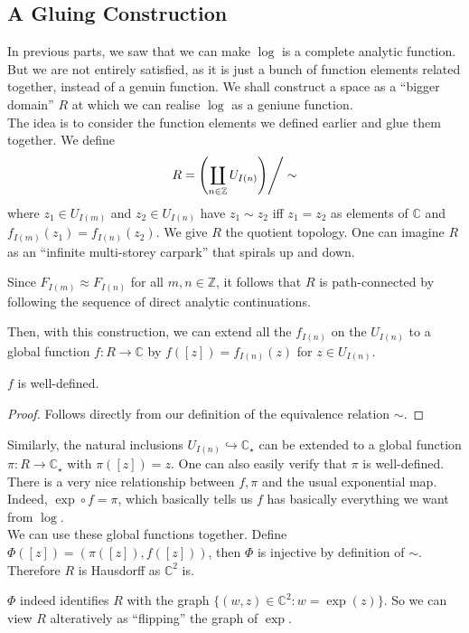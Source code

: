 \subsection{A Gluing Construction}
In previous parts, we saw that we can make $\log$ is a complete analytic function.
But we are not entirely satisfied, as it is just a bunch of function elements related together, instead of a genuin function.
We shall construct a space as a ``bigger domain'' $R$ at which we can realise $\log$ as a geniune function.\\
The idea is to consider the function elements we defined earlier and glue them together.
We define
$$R=\left( \coprod_{n\in\mathbb Z}U_{I(n)} \middle)\right/\sim$$
where $z_1\in U_{I(m)}$ and $z_2\in U_{I(n)}$ have $z_1\sim z_2$ iff $z_1=z_2$ as elements of $\mathbb C$ and $f_{I(m)}(z_1)=f_{I(n)}(z_2)$.
We give $R$ the quotient topology.
One can imagine $R$ as an ``infinite multi-storey carpark'' that spirals up and down.
\begin{remark}
    Since $F_{I(m)}\approx F_{I(n)}$ for all $m,n\in\mathbb Z$, it follows that $R$ is path-connected by following the sequence of direct analytic continuations.
\end{remark}
Then, with this construction, we can extend all the $f_{I(n)}$ on the $U_{I(n)}$ to a global function $f:R\to\mathbb C$ by $f([z])=f_{I(n)}(z)$ for $z\in U_{I(n)}$.
\begin{proposition}
    $f$ is well-defined.
\end{proposition}
\begin{proof}
    Follows directly from our definition of the equivalence relation $\sim$.
\end{proof}
Similarly, the natural inclusions $U_{I(n)}\hookrightarrow\mathbb C_\star$ can be extended to a global function $\pi:R\to\mathbb C_\star$ with $\pi([z])=z$.
One can also easily verify that $\pi$ is well-defined.
There is a very nice relationship between $f,\pi$ and the usual exponential map.
Indeed, $\exp\circ f=\pi$, which basically tells us $f$ has basically everything we want from $\log$.\\
We can use these global functions together.
Define $\Phi([z])=(\pi([z]),f([z]))$, then $\Phi$ is injective by definition of $\sim$.
Therefore $R$ is Hausdorff as $\mathbb C^2$ is.
\begin{remark}
    $\Phi$ indeed identifies $R$ with the graph $\{(w,z)\in\mathbb C^2:w=\exp(z)\}$.
    So we can view $R$ alteratively as ``flipping'' the graph of $\exp$.
\end{remark}